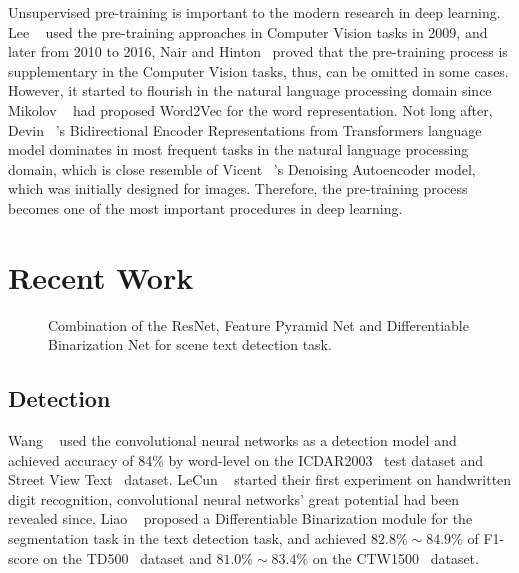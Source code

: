 \documentclass[10pt,twocolumn,letterpaper]{article}
\begin{document}
  Unsupervised pre-training is important to the modern research in deep learning.
  Lee \etal~\cite{lee2009convolutional} used the pre-training approaches in Computer Vision tasks in 2009, and later from 2010 to 2016,
  Nair and Hinton~\cite{nair2010rectified} proved that the pre-training process is supplementary in the Computer Vision tasks,
  thus, can be omitted in some cases.
  However, it started to flourish in the natural language processing domain since Mikolov \etal~\cite{mikolov2013distributed} had proposed Word2Vec for the word representation.
  Not long after, Devin \etal~\cite{devlin2019bert}'s Bidirectional Encoder Representations from Transformers language model dominates
  in most frequent tasks in the natural language processing domain,
  which is close resemble of Vicent \etal~\cite{vincent2008extracting}'s Denoising Autoencoder model, which was initially designed for images.
  Therefore, the pre-training process becomes one of the most important procedures in deep learning.


\section{Recent Work}

\begin{figure*}
\begin{center}
\end{center}
   \caption{Combination of the ResNet, Feature Pyramid Net and Differentiable Binarization Net for scene text detection task.}
\label{fig:short}
\end{figure*}

\subsection{Detection}

  Wang \etal~\cite{wang2012end} used the convolutional neural networks as a detection model and achieved accuracy of 84\% by word-level on the ICDAR2003~\cite{lucas2003icdar} test dataset and Street View Text~\cite{wang2011end} dataset.
  LeCun \etal~\cite{lecun1990handwritten} started their first experiment on handwritten digit recognition, convolutional neural networks' great potential had been revealed since.
  Liao \etal~\cite{liao2020real} proposed a Differentiable Binarization module for the segmentation task in the text detection task, and achieved $82.8\%\sim84.9\%$ of F1-score on the TD500~\cite{yao2012detecting} dataset
   and $81.0\%\sim83.4\%$ on the CTW1500~\cite{liu2019curved} dataset.
\end{document}

